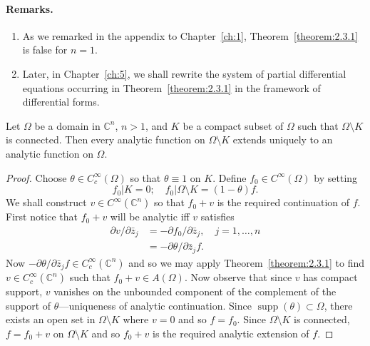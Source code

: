 \paragraph*{Remarks.}
\begin{enumerate}
\item As we remarked in the appendix to Chapter~\ref{ch:1}, Theorem~\ref{theorem:2.3.1} is false for $n=1$.
\item Later, in Chapter~\ref{ch:5}, we shall rewrite the system of partial differential equations occurring in Theorem~\ref{theorem:2.3.1} in the framework of differential forms.
\end{enumerate}
 Let $\Omega$ be a domain in $\mathbb C^n$, $n>1$, and $K$ be a compact subset of $\Omega$ such that $\Omega\setminus K$ is connected. Then every analytic function on $\Omega\setminus K$ extends uniquely to an analytic function on $\Omega$.
\begin{proof}
Choose $\theta\in C_c^\infty(\Omega)$ so that $\theta\equiv1$ on $K$. Define $f_0\in C^\infty(\Omega)$ by setting
\[f_0|K=0;\quad f_0|\Omega\setminus K=(1-\theta)f.\]
We shall construct $v\in C^\infty(\mathbb C^n)$ so that $f_0+v$ is the required continuation of $f$. First notice that $f_0+v$ will be analytic iff $v$ satisfies
\begin{align*}
\partial v/\partial\bar z_j&=-\partial f_0/\partial\bar z_j,\quad j=1,\ldots,n\\
&=-\partial\theta/\partial\bar z_j f.
\end{align*}
Now $-\partial\theta/\partial\bar z_j f\in C_c^\infty(\mathbb C^n)$ and so we may apply Theorem~\ref{theorem:2.3.1} to find $v\in C_c^\infty(\mathbb C^n)$ such that $f_0+v\in A(\Omega)$. Now observe that since $v$ has compact support, $v$ vanishes on the unbounded component of the complement of the support of $\theta$---uniqueness of analytic continuation. Since $\operatorname{supp}(\theta)\subset\Omega$, there exists an open set in $\Omega\setminus K$ where $v=0$ and so $f=f_0$. Since $\Omega\setminus K$ is connected, $f=f_0+v$ on $\Omega\setminus K$ and so $f_0+v$ is the required analytic extension of $f$.
\end{proof}
